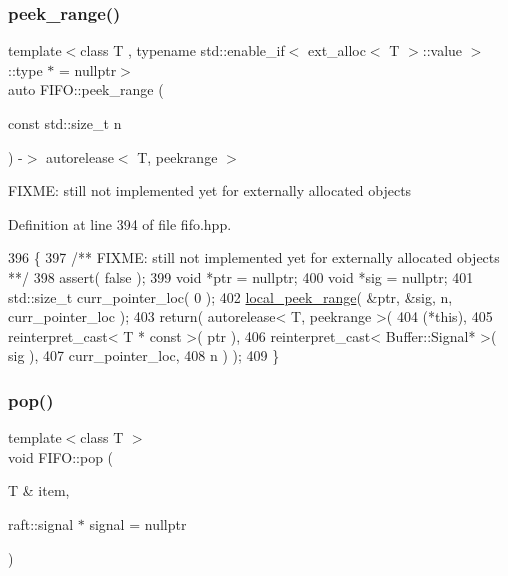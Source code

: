 \subsubsection{\texorpdfstring{peek\+\_\+range()}{peek\_range()}\hspace{0.1cm}{\footnotesize\ttfamily [2/2]}}
{\footnotesize\ttfamily template$<$class T , typename std\+::enable\+\_\+if$<$ ext\+\_\+alloc$<$ T $>$\+::value $>$\+::type $\ast$  = nullptr$>$ \\
auto F\+I\+F\+O\+::peek\+\_\+range (\begin{DoxyParamCaption}\item[{const std\+::size\+\_\+t}]{n }\end{DoxyParamCaption}) -\/$>$ autorelease$<$ T, peekrange $>$
   \hspace{0.3cm}{\ttfamily [inline]}}

F\+I\+X\+ME\+: still not implemented yet for externally allocated objects 

Definition at line 394 of file fifo.\+hpp.


\begin{DoxyCode}
396    \{\textcolor{comment}{}
397 \textcolor{comment}{      /** FIXME: still not implemented yet for externally allocated objects **/}
398       assert( \textcolor{keyword}{false} );
399       \textcolor{keywordtype}{void} *ptr = \textcolor{keyword}{nullptr};
400       \textcolor{keywordtype}{void} *sig = \textcolor{keyword}{nullptr};
401       std::size\_t curr\_pointer\_loc( 0 );
402       \hyperlink{class_f_i_f_o_a8056adb06fadf2b7aae4d9858795be45}{local\_peek\_range}( &ptr, &sig, n, curr\_pointer\_loc );
403       \textcolor{keywordflow}{return}( autorelease< T, peekrange >( 
404          (*\textcolor{keyword}{this}),
405          reinterpret\_cast< T * const >( ptr ),
406          reinterpret\_cast< Buffer::Signal* >( sig ),
407          curr\_pointer\_loc,
408          n ) );
409    \}
\end{DoxyCode}
\hypertarget{class_f_i_f_o_a0607b6c931ed1fab618e637af617dd15}{}\label{class_f_i_f_o_a0607b6c931ed1fab618e637af617dd15} 
\subsubsection{\texorpdfstring{pop()}{pop()}}
{\footnotesize\ttfamily template$<$class T $>$ \\
void F\+I\+F\+O\+::pop (\begin{DoxyParamCaption}\item[{T \&}]{item,  }\item[{raft\+::signal $\ast$}]{signal = {\ttfamily nullptr} }\end{DoxyParamCaption})\hspace{0.3cm}{\ttfamily [inline]}}

